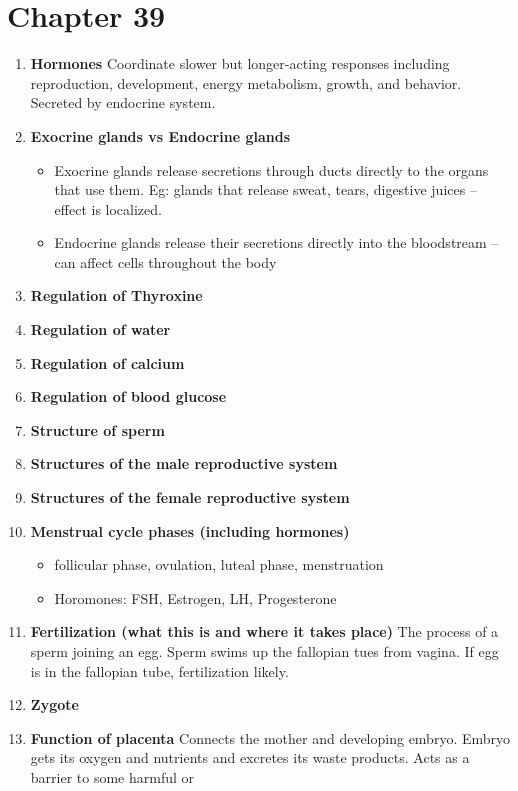 \documentclass[9pt]{article}
\begin{document}
\section*{Chapter 39}
\begin{enumerate}
  \item {\bf Hormones} Coordinate slower but longer-acting responses
    including reproduction, development, energy metabolism, growth,
    and behavior. Secreted by endocrine system.
  \item {\bf Exocrine glands vs Endocrine glands}
    \begin{itemize}
      \item Exocrine glands release secretions through ducts directly
        to the organs that use them. Eg: glands that release sweat,
        tears, digestive juices – effect is localized.
      \item Endocrine glands release their secretions directly into
        the bloodstream – can affect cells throughout the body
    \end{itemize}
  \item {\bf Regulation of Thyroxine}
  \item {\bf Regulation of water}
  \item {\bf Regulation of calcium}
  \item {\bf Regulation of blood glucose}
  \item {\bf Structure of sperm}
  \item {\bf Structures of the male reproductive system}
  \item {\bf Structures of the female reproductive system}
  \item {\bf Menstrual cycle phases (including hormones)}
    \begin{itemize}
    \item follicular phase, ovulation, luteal phase, menstruation
    \item Horomones: FSH, Estrogen, LH, Progesterone
    \end{itemize}
  \item {\bf Fertilization (what this is and where it takes place)}
    The process of a sperm joining an egg. Sperm swims up the
    fallopian tues from vagina. If egg is in the fallopian tube,
    fertilization likely.
  \item {\bf Zygote}
  \item {\bf Function of placenta} Connects the mother and developing
    embryo. Embryo gets its oxygen and nutrients and excretes its
    waste products. Acts as a barrier to some harmful or

\end{enumerate}
\end{document}
